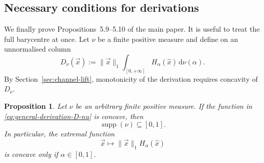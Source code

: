 \documentclass[aps,pra,11pt,onecolumn,nofootinbib,tightenlines]{revtex4-2}
\newtheorem{proposition}[theorem]{Proposition}
\theoremstyle{definition}
\begin{document}
\subsection{Necessary conditions for derivations}
\label{sec:derivation-necessity}

We finally prove Propositions~5.9--5.10 of the main paper.  It is useful
to treat the full barycentre at once. Let $\nu$ be a finite positive measure and define on an unnormalised column
\begin{equation}
 D_\nu(\vec x)
 :=\|\vec x\|_1
   \int_{[0,+\infty]}H_\alpha(\widehat x)\,\mathrm d\nu(\alpha).
 \label{eq:general-derivation-D-nu}
\end{equation}
By Section~\ref{sec:channel-lift}, monotonicity of the derivation requires concavity of $D_\nu$.

\begin{proposition}
\label{prop:derivation-necessary}
Let $\nu$ be an arbitrary finite positive measure. If the function in \eqref{eq:general-derivation-D-nu} is concave, then
\begin{equation}
 \operatorname{supp}(\nu)\subseteq[0,1].
 \label{eq:derivation-support-necessary}
\end{equation}
In particular, the extremal function
\begin{equation}
 \vec x\longmapsto
 \|\vec x\|_1H_\alpha(\widehat x)
 \label{eq:extremal-derivation-column}
\end{equation}
 is concave only if $\alpha\in[0,1]$.
\end{proposition}
\end{document}
